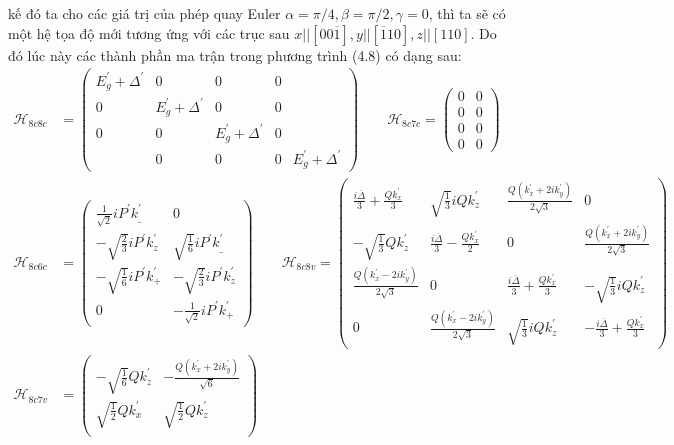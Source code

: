kế đó ta cho các giá trị của phép quay Euler $\alpha=\pi/4,\beta=\pi/2,\gamma=0$, thì ta sẽ có một hệ tọa độ mới tương ứng với các trục sau $\mathit{x}||[00\overline{1}],y||[\overline{1}10],z||[110]$. Do đó lúc này các thành phần ma trận trong phương trình (4.8) có dạng sau:
\begin{align*}
\mathcal{H}_{8c8c}&=\begin{pmatrix}
E_g^{'}+\Delta^{'} & 0 & 0 & 0 \\
0 & E_g^{'}+\Delta^{'} & 0  & 0 \\
0 &0 &E_g^{'}+\Delta^{'} & 0 \\
& 0 & 0 & 0 &E_g^{'}+\Delta^{'} 
\end{pmatrix}\qquad
\mathcal{H}_{8c7c}=\begin{pmatrix}
0 & 0 \\
0 & 0 \\
0 & 0 \\
0 & 0 
\end{pmatrix}\\
\mathcal{H}_{8c6c}&=\begin{pmatrix}
\frac{1}{\sqrt{2}}iP^{'}k_\_^{'}  &0\\
-\sqrt{\frac{2}{3}}iP^{'}k_z^{'}  & \sqrt{\frac{1}{6}}iP^{'}k_\_^{'}  \\
-\sqrt{\frac{1}{6}}iP^{'}k_+^{'}  & -\sqrt{\frac{2}{3}}iP^{'}k_z^{'}  \\
0 & -\frac{1}{\sqrt{2}}iP^{'}k_+^{'}  
\end{pmatrix}\qquad
\mathcal{H}_{8c8v}=\begin{pmatrix}
\frac{i\overline{\Delta}}{3}+\frac{Qk_x^{'}}{3} &\sqrt{\frac{1}{3}}iQk_z^{'}  &\frac{Q(k_x^{'}+2ik_y^{'})}{2\sqrt{3}}  & 0\\
-\sqrt{\frac{1}{3}}Qk_z^{'}  &\frac{i\overline{\Delta}}{3} -\frac{Qk_x^{'}}{2} &0 & \frac{Q(k_x^{'}+2ik_y^{'})}{2\sqrt{3}} \\
\frac{Q(k_x^{'}-2ik_y^{'})}{2\sqrt{3}}  &0 &\frac{i\overline{\Delta}}{3}+\frac{Qk_x^{'}}{3} &-\sqrt{\frac{1}{3}}iQk_z^{'} \\
 0  &\frac{Q(k_x^{'}-2ik_y^{'})}{2\sqrt{3}}   & \sqrt{\frac{1}{3}}iQk_z^{'}  &-\frac{i\overline{\Delta}}{3}+\frac{Qk_x^{'}}{3} 
\end{pmatrix}\\
\mathcal{H}_{8c7v}&=\begin{pmatrix}
-\sqrt{\frac{1}{6}}Qk_z^{'}  &-\frac{Q(k_x^{'}+2ik_y^{'})}{\sqrt{6}} \\
 \sqrt{\frac{1}{2}}Qk_x^{'}&\sqrt{\frac{1}{2}}Qk_z^{'}  \\

\end{pmatrix}
\end{align*}
